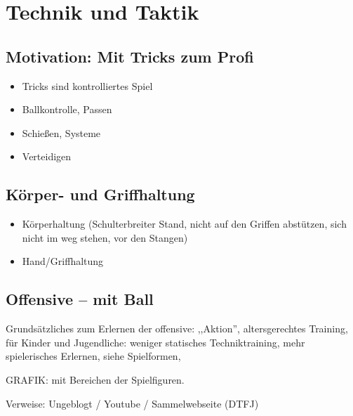 \chapter{Technik und Taktik}
\label{technik}

\section{Motivation: Mit Tricks zum Profi}
\label{technik:motivation}

\begin{itemize}
\item Tricks sind kontrolliertes Spiel
\item Ballkontrolle, Passen
\item Schießen, Systeme
\item Verteidigen
\end{itemize}

\section{Körper- und Griffhaltung}
\label{technik:haltung}

\begin{itemize}
\item Körperhaltung (Schulterbreiter Stand, nicht auf den Griffen abstützen, sich nicht im weg stehen, vor den Stangen)
\item Hand/Griffhaltung
\end{itemize}

\section{Offensive -- mit Ball}
\label{technik:offensive}


Grundsätzliches zum Erlernen der \gls{offensive}: ,,Aktion'', altersgerechtes Training,  für Kinder und Jugendliche: weniger statisches Techniktraining, mehr spielerisches Erlernen, siehe Spielformen,

GRAFIK: mit Bereichen der Spielfiguren.

Verweise: Ungeblogt / Youtube / Sammelwebseite (DTFJ)


